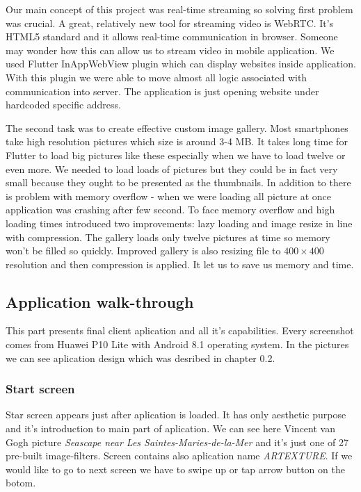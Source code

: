 \documentclass[../Main.tex]{subfiles}
\begin{document}
Our main concept of this project was real-time streaming so solving first problem was crucial.
A great, relatively new tool for streaming video is WebRTC.
It's HTML5 standard and it allows real-time communication in browser. 
Someone may wonder how this can allow us to stream video in mobile application.
We used Flutter InAppWebView plugin which can display websites inside application.
With this plugin we were able to move almost all logic associated with communication into server.
The application is just opening website under hardcoded specific address.

The second task was to create effective custom image gallery. 
Most smartphones take high resolution pictures which size is around 3-4 MB.
It takes long time for Flutter to load big pictures like these especially when
we have to load twelve or even more. We needed to load loads of pictures but they could be in fact very small because they ought to be presented as the thumbnails.
In addition to there is problem with 
memory overflow - when we were loading all picture at once application was
crashing after few second. 
To face memory overflow and high loading times introduced two improvements:
lazy loading and image resize in line with compression.
The gallery loads only twelve pictures at time so memory won't be filled so quickly.
Improved gallery is also resizing file to $400\times400$ resolution and then compression is applied.
It let us to save us memory and time.


\subsection{Application walk-through}
This part presents final client aplication and all it's capabilities.
Every screenshot comes from Huawei P10 Lite with Android 8.1 operating system. In the pictures we can see aplication design which was desribed in chapter 0.2.

\subsubsection{Start screen}
Star screen appears just after aplication is loaded. It has only aesthetic purpose and it's introduction to main part of aplication. We can see here Vincent van Gogh picture \textit{Seascape near Les Saintes-Maries-de-la-Mer} and it's just one of 27 pre-built image-filters. Screen contains also aplication name \textit{ARTEXTURE}. If we would like to go to next screen we have to swipe up or tap arrow button on the botom.
\end{document}
